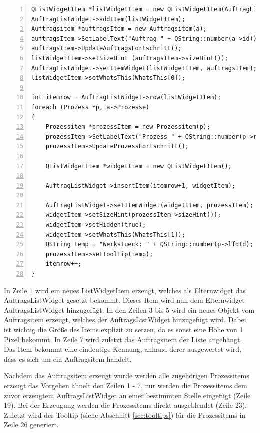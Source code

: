 \begin{lstlisting}[frame=single, breaklines=true, numbers=left, stepnumber=2, firstnumber=1, numberstyle = \tiny, caption=Funktionsinhalt AddAuftragsItem ,label=lst:AddAuftragsItem]
QListWidgetItem *listWidgetItem = new QListWidgetItem(AuftragListWidget);
AuftragListWidget->addItem(listWidgetItem);
Auftragsitem *auftragsItem = new Auftragsitem(a);
auftragsItem->SetLabelText("Auftrag " + QString::number(a->id));
auftragsItem->UpdateAuftragsFortschritt();
listWidgetItem->setSizeHint (auftragsItem->sizeHint());
AuftragListWidget->setItemWidget(listWidgetItem, auftragsItem);
listWidgetItem->setWhatsThis(WhatsThis[0]);

int itemrow = AuftragListWidget->row(listWidgetItem);
foreach (Prozess *p, a->Prozesse)
{
    Prozessitem *prozessItem = new Prozessitem(p);
    prozessItem->SetLabelText("Prozess " + QString::number(p->referenzId));
    prozessItem->UpdateProzessFortschritt();

    QListWidgetItem *widgetItem = new QListWidgetItem();

    AuftragListWidget->insertItem(itemrow+1, widgetItem);

    AuftragListWidget->setItemWidget(widgetItem, prozessItem);
    widgetItem->setSizeHint(prozessItem->sizeHint());
    widgetItem->setHidden(true);
    widgetItem->setWhatsThis(WhatsThis[1]);
    QString temp = "Werkstueck: " + QString::number(p->lfdId);
    prozessItem->setToolTip(temp);
    itemrow++;
}
\end{lstlisting}

In Zeile 1 wird ein neues ListWidgetItem erzeugt, welches als Elternwidget das AuftragsListWidget gesetzt bekommt. Dieses Item wird nun dem Elternwidget AuftragsListWidget hinzugefügt. In den Zeilen 3 bis 5 wird ein neues Objekt vom Auftragsitem erzeugt, welches der AuftragsListWidget hinzugefügt wird. Dabei ist wichtig die Größe des Items explizit zu setzen, da es sonst eine Höhe von 1 Pixel bekommt. In Zeile 7 wird zuletzt das Auftragsitem der Liste angehängt. Das Item bekommt eine eindeutige Kennung, anhand derer ausgewertet wird, dass es sich um ein Auftragsitem handelt.

Nachdem das Auftragsitem erzeugt wurde werden alle zugehörigen Prozessitems erzeugt das Vorgehen ähnelt den Zeilen 1 - 7, nur werden die Prozessitems dem zuvor erzeugtem AuftragsListWidget an einer bestimmten Stelle eingefügt (Zeile 19). Bei der Erzeugung werden die Prozessitems direkt ausgeblendet (Zeile 23). Zuletzt wird der Tooltip (siehe Abschnitt \ref{sec:tooltips}) für die Prozessitems in Zeile 26 generiert.


